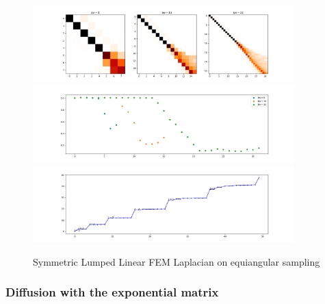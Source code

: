 \begin{figure}[h]
	\label{fig:symmetricFEMequiangularLumped}
	\caption{Symmetric Lumped Linear FEM Laplacian on equiangular sampling}
	\centering
	\includegraphics[width=0.9\textwidth]{../codes/03.FEM_laplacian/equiangular/mass_lumping/BLB/img/linearFEM.png}
	\includegraphics[width=0.9\textwidth]{../codes/03.FEM_laplacian/equiangular/mass_lumping/BLB/img/linearFEM_diagonal.png}	
	\includegraphics[width=0.9\textwidth]{../codes/03.FEM_laplacian/equiangular/mass_lumping/BLB/img/FEM_eigenvalues_32.png}	
\end{figure}
\subsubsection{Diffusion with the exponential matrix}

